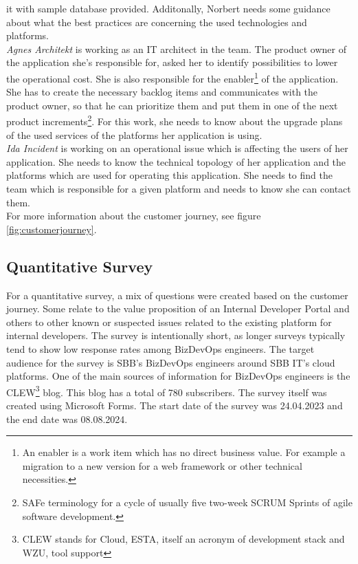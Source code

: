 \documentclass[a4paper,12pt]{article}
\begin{document}
    it with sample database provided.
    Additonally, Norbert needs some guidance about what the best practices are concerning the used technologies and platforms.\\
    \textit{Agnes Architekt} is working as an IT architect in the team.
    The product owner of the application she's responsible for, asked her to identify possibilities to lower the operational cost.
    She is also responsible for the enabler\footnote{An enabler is a work item which has no direct business value.
    For example a migration to a new version for a web framework or other technical necessities.} of the application.
    She has to create the necessary backlog items and communicates with the product owner, so that he can prioritize
    them and put them in one of the next product increments\footnote{SAFe terminology for a cycle of usually five two-week SCRUM Sprints of agile software development.}.
    For this work, she needs to know about the upgrade plans of the used services of the platforms her application is using.     \\
    \textit{Ida Incident} is working on an operational issue which is affecting the users of her application.
    She needs to know the technical topology of her application and the platforms which are used for operating this application.
    She needs to find the team which is responsible for a given platform and needs to know she can contact them.\\
    For more information about the customer journey, see figure \ref{fig:customerjourney}.

    \subsection{Quantitative Survey}
    \label{subsec:quansur}
    For a quantitative survey, a mix of questions were created based on the customer journey.
    Some relate to the value proposition of an Internal Developer Portal and others to other known or suspected issues
    related to the existing platform for internal developers.
    The survey is intentionally short, as longer surveys typically tend to show low response rates among BizDevOps engineers.
    The target audience for the survey is SBB's BizDevOps engineers around SBB IT's cloud platforms.
    One of the main sources of information for BizDevOps engineers is the CLEW\footnote{CLEW stands for Cloud, ESTA,
        itself an acronym of development stack and WZU, tool support} blog.
    This blog has a total of 780 subscribers.
    The survey itself was created using Microsoft Forms.
    The start date of the survey was 24.04.2023 and the end date was 08.08.2024.
\end{document}
